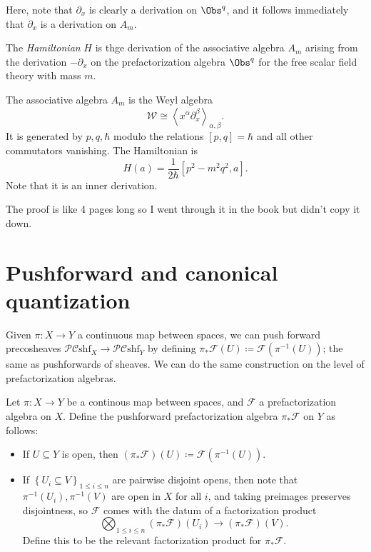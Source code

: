 Here, note that $\partial _x$ is clearly a derivation on $\Obs^{q} $, and it follows immediately that $\partial_x$ is a derivation on $A_m$.

\begin{definition}\label{dfn:4-3-4}
	The \emph{Hamiltonian} $H$ is thge derivation of the associative algebra $A_m$ arising from the derivation $-\partial _x$ on the prefactorization algebra $\Obs^{q} $ for the free scalar field theory with mass $m$.
\end{definition}
\begin{proposition}\label{prp:4-3-5}
	The associative algebra $A_m$ is the Weyl algebra
	\[
		\mathcal{W} \cong \left\langle x^{\alpha } \partial _x^{\beta }  \right\rangle_{\alpha ,\beta }  
	.\]
	It is generated by $p,q,\hbar $ modulo the relations $[p,q]=\hbar $ and all other commutators vanishing. The Hamiltonian is
	\[
		H(a)=\frac{1}{2\hbar } \left[ p^2-m^2q^2,a \right] 
	.\]
	Note that it is an inner derivation.
\end{proposition}

The proof is like 4 pages long so I went through it in the book but didn't copy it down.

\section{Pushforward and canonical quantization}

Given $\pi : X \to Y$ a continuous map between spaces, we can push forward precosheaves $\mathcal{P} \mathcal{C} \mathrm{shf}_X \to \mathcal{P} \mathcal{C} \mathrm{shf} _Y$ by defining $\pi _*\mathcal{F} (U) \coloneqq \mathcal{F} (\pi ^{-1} (U))$; the same as pushforwards of sheaves. We can do the same construction on the level of prefactorization algebras.

\begin{definition}\label{dfn:4-4-1}
	Let $\pi : X \to Y$ be a continous map between spaces, and $\mathcal{F}$ a prefactorization algebra on $X$. Define the pushforward prefactorization algebra $\pi _*\mathcal{F} $ on $Y$ as follows:
	\begin{itemize}
		\item If $U\subseteq Y$ is open, then $(\pi _*\mathcal{F} )(U)\coloneqq \mathcal{F} (\pi ^{-1} (U))$.
		\item If $\left\{ U_i\subseteq V \right\} _{1\leq i\leq n} $ are pairwise disjoint opens, then note that $\pi ^{-1}(U_i),\pi ^{-1} (V)$ are open in $X$ for all $i$, and taking preimages preserves disjointness, so $\mathcal{F} $ comes with the datum of a factorization product
			\[
				\bigotimes_{1\leq i\leq n} (\pi _*\mathcal{F})(U_i)\to (\pi _*\mathcal{F}) (V)
			.\]
			Define this to be the relevant factorization product for $\pi _*\mathcal{F} $.
	\end{itemize}
\end{definition}

